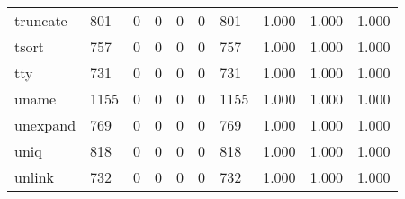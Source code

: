 \begin{longtable}{lp{2.0cm}p{2.0cm}p{2.0cm}p{2.0cm}p{2.0cm}p{2.0cm}p{2.0cm}p{2.0cm}p{2.0cm}}
truncate  &                    801 &                                  0 &                                 0 &                                0 &                                 0 &                             801 &                                1.000 &                                  1.000 &                                1.000 \\
tsort     &                    757 &                                  0 &                                 0 &                                0 &                                 0 &                             757 &                                1.000 &                                  1.000 &                                1.000 \\
tty       &                    731 &                                  0 &                                 0 &                                0 &                                 0 &                             731 &                                1.000 &                                  1.000 &                                1.000 \\
uname     &                   1155 &                                  0 &                                 0 &                                0 &                                 0 &                            1155 &                                1.000 &                                  1.000 &                                1.000 \\
unexpand  &                    769 &                                  0 &                                 0 &                                0 &                                 0 &                             769 &                                1.000 &                                  1.000 &                                1.000 \\
uniq      &                    818 &                                  0 &                                 0 &                                0 &                                 0 &                             818 &                                1.000 &                                  1.000 &                                1.000 \\
unlink    &                    732 &                                  0 &                                 0 &                                0 &                                 0 &                             732 &                                1.000 &                                  1.000 &                                1.000 \\

\end{longtable}
